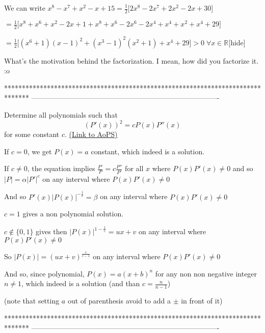 \begin{solution}
	\begin{tcolorbox}
[hide = Alternate] We can write $x^8-x^7+x^2-x+15 = \frac{1}{2}\bigg[2x^8-2x^7+2x^2-2x+30\bigg]$

$ = \frac{1}{2}\bigg[x^8+x^6+x^2-2x+1+x^8+x^6-2x^6-2x^4+x^4+x^2+x^4+29\bigg]$

$ = \frac{1}{2}\bigg[(x^6+1)(x-1)^2+(x^3-1)^2(x^2+1)+x^4+29\bigg]>0\;\forall x \in \mathbb{R}$[\/hide]\end{tcolorbox}
What's the motivation behind the factorization. I mean, how did you factorize it. :o

\end{solution}
*******************************************************************************
-------------------------------------------------------------------------------

\begin{problem}
	Determine all polynomials such that \[(P{}'(x))^2=cP(x)P{}''(x)\] for some constant $c$.
	\flushright \href{https://artofproblemsolving.com/community/c6h480262}{(Link to AoPS)}
\end{problem}



\begin{solution}
	If $c=0$, we get $P(x)=a$ constant, which indeed is a solution.

If $c\ne 0$, the equation implies $\frac {P'}{P}=c\frac{P''}{P'}$ for all $x$ where $P(x)P'(x)\ne 0$ and so $|P|=\alpha|P'|^c$ on any interval where $P(x)P'(x)\ne 0$

And so $P'(x)|P(x)|^{-\frac 1c}=\beta$ on any interval where $P(x)P'(x)\ne 0$

$c=1$ gives a non polynomial solution.

$c\notin\{0,1\}$ gives then $|P(x)|^{1-\frac 1c}=ux+v$ on any interval where $P(x)P'(x)\ne 0$

So $|P(x)|=(ux+v)^{\frac c{c-1}}$ on any interval where $P(x)P'(x)\ne 0$

And so, since polynomial, $\boxed{P(x)=a(x+b)^n}$ for any non non negative integer $n\ne 1$, which indeed is a solution (and than $c=\frac n{n-1}$)

(note that setting $a$ out of parenthesis avoid to add a $\pm$ in front of it)
\end{solution}
*******************************************************************************
-------------------------------------------------------------------------------

